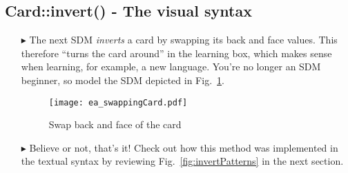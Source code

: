 \newpage
\subsection{Card::invert() - The visual syntax}
\visHeader
\hypertarget{invertCard vis}{}

\begin{itemize}

\item[$\blacktriangleright$] The next SDM \emph{inverts} a card by swapping its back and face values. This therefore ``turns the card around'' in the learning box, which makes sense when
learning, for example, a new language. You're no longer an SDM beginner, so model the SDM depicted in Fig.~\ref{fig:sdm_invert}.

\vspace{1cm}

\begin{figure}[htbp]
\begin{center}
  \texttt{[image: ea\_swappingCard.pdf]}
  \caption{Swap back and face of the card}  
  \label{fig:sdm_invert}
\end{center}
\end{figure}

\item[$\blacktriangleright$] Believe or not, that's it! Check out how this method was implemented in the textual syntax by reviewing
Fig.~\ref{fig:invertPatterns} in the next section.

\end{itemize}
